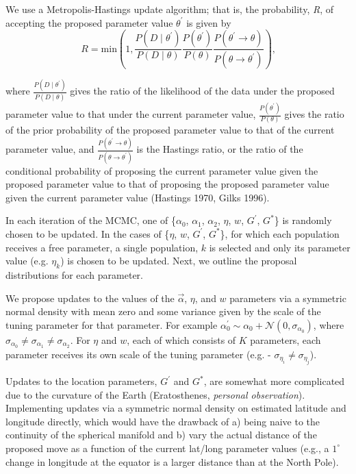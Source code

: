 \documentclass[12pt]{article}
\newcommand{\identifyadmixsource}[1]{{#1^{*}}}
\begin{document}
We use a Metropolis-Hastings update algorithm; that is, the probability, \emph{R}, of accepting the proposed parameter value $\theta^{\prime}$ is given by 
\begin{equation}
R = \text{min}\left(1, \frac{P(D \mid \theta^{\prime})} {P(D \mid \theta)} 
				\frac{P(\theta^{\prime})}{P(\theta)} 
				\frac{P(\theta^{\prime} \to \theta)}{P(\theta \to \theta^{\prime})}		\right) \text{,}
\label{eq:MH_algorithm}
\end{equation}

where $\frac{P(D \mid \theta^{\prime})} {P(D \mid \theta)}$ gives the ratio of the likelihood of the data under the proposed parameter value to that under the current parameter value, $\frac{P(\theta^{\prime})}{P(\theta)}$ gives the ratio of the prior probability of the proposed parameter value to that of the current parameter value, and $\frac{P(\theta^{\prime} \to \theta)}{P(\theta \to \theta^{\prime})}$ is the Hastings ratio, or the ratio of the conditional probability of proposing the current parameter value given the proposed parameter value to that of proposing the proposed parameter value given the current parameter value (Hastings 1970, Gilks 1996).

In each iteration of the MCMC, one of \{$\alpha_0$, $\alpha_1$, $\alpha_2$, $\eta$, $w$, $G^{\prime}$, $\identifyadmixsource{G}$\} is randomly chosen to be updated.  In the cases of \{$\eta$, $w$, $G^{\prime}$, $\identifyadmixsource{G}$\}, for which each population receives a free parameter, a single population, $k$ is selected and only its parameter value (e.g. $\eta_k$) is chosen to be updated.  Next, we outline the proposal distributions for each parameter.

We propose updates to the values of the $\vec{\alpha}$, $\eta$, and $w$ parameters via a symmetric normal density with mean zero and some variance given by the scale of the tuning parameter for that parameter.  For example $\alpha_0^{\prime} \sim \alpha_0 + \mathcal{N}(0,\sigma_{\alpha_0})$, where $\sigma_{\alpha_0} \neq \sigma_{\alpha_1} \neq \sigma_{\alpha_2}$.  For $\eta$ and $w$, each of which consists of $K$ parameters, each parameter receives its own scale of the tuning parameter (e.g. - $\sigma_{\eta_{i}} \neq \sigma_{\eta_{j}}$).  

Updates to the location parameters, $G^{\prime}$ and $\identifyadmixsource{G}$, are somewhat more complicated due to the curvature of the Earth (Eratosthenes, \textit{personal observation}).  Implementing updates via a symmetric normal density on estimated latitude and longitude directly, which would have the drawback of a) being naive to the continuity of the spherical manifold and b) vary the actual distance of the proposed move as a function of the current lat/long parameter values (e.g., a $1^{\circ}$ change in longitude at the equator is a larger distance than at the North Pole).  
\end{document}
